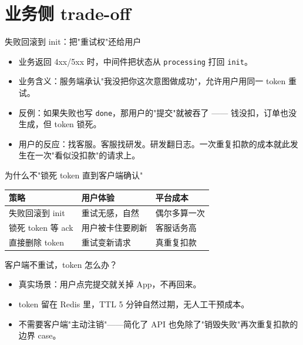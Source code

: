 \section{业务侧 trade-off}

\begin{frame}{失败回滚到 init：把"重试权"还给用户}
\begin{itemize}
  \item 业务返回 4xx/5xx 时，中间件把状态从 \texttt{processing} 打回 \texttt{init}。
  \item 业务含义：服务端承认"我没把你这次意图做成功"，允许用户用同一 token 重试。
  \item 反例：如果失败也写 \texttt{done}，那用户的"提交"就被吞了 —— 钱没扣，订单也没生成，但 token 锁死。
  \item 用户的反应：找客服。客服找研发。研发翻日志。一次重复扣款的成本就此发生在一次"看似没扣款"的请求上。
\end{itemize}
\end{frame}

\begin{frame}{为什么不"锁死 token 直到客户端确认"}
\begin{tabular}{@{}lll@{}}
\toprule
策略 & 用户体验 & 平台成本 \\
\midrule
失败回滚到 init & 重试无感，自然 & 偶尔多算一次 \\
锁死 token 等 ack & 用户被卡住要刷新 & 客服话务高 \\
直接删除 token & 重试变新请求 & 真重复扣款 \\
\bottomrule
\end{tabular}
\vspace{2mm}
\end{frame}

\begin{frame}{客户端不重试，token 怎么办？}
\begin{itemize}
  \item 真实场景：用户点完提交就关掉 App，不再回来。
  \item token 留在 Redis 里，TTL 5 分钟自然过期，无人工干预成本。
  \item 不需要客户端"主动注销"——简化了 API 也免除了"销毁失败"再次重复扣款的边界 case。
\end{itemize}
\vspace{2mm}
\end{frame}

